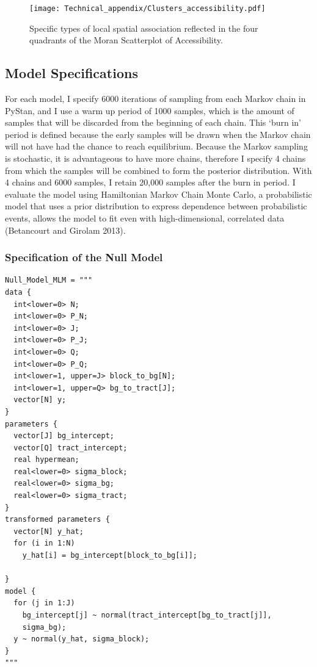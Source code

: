 \documentclass[a4paper,UKenglish]{lipics-v2018}
\begin{document}
\begin{figure}[H]
    \centering
    \texttt{[image: Technical\_appendix/Clusters\_accessibility.pdf]}
    \caption[Clusters of Accessibility]{Specific types of local spatial association reflected in the four quadrants of the Moran Scatterplot of Accessibility.} 
    \label{fig:Clusters Autocorrelation}
\end{figure}

\subsection{Model Specifications}
For each model, I specify 6000 iterations of sampling from each Markov chain in PyStan, and I use a warm up period of 1000 samples, which is the amount of samples that will be discarded from the beginning of each chain. This ‘burn in’ period is defined because the early samples will be drawn when the Markov chain will not have had the chance to reach equilibrium. Because the Markov sampling is stochastic, it is advantageous to have more chains, therefore I specify 4 chains from which the samples will be combined to form the posterior distribution. With 4 chains and 6000 samples, I retain 20,000 samples after the burn in period. I evaluate the model using Hamiltonian Markov Chain Monte Carlo, a probabilistic model that uses a prior distribution to express dependence between probabilistic events, allows the model to fit even with high-dimensional, correlated data (Betancourt and Girolam 2013).

\subsubsection{Specification of the Null Model}
\begin{lstlisting}[caption=Null Model example]
Null_Model_MLM = """
data {
  int<lower=0> N; 
  int<lower=0> P_N; 
  int<lower=0> J; 
  int<lower=0> P_J; 
  int<lower=0> Q; 
  int<lower=0> P_Q; 
  int<lower=1, upper=J> block_to_bg[N];
  int<lower=1, upper=Q> bg_to_tract[J];
  vector[N] y;
} 
parameters {
  vector[J] bg_intercept;
  vector[Q] tract_intercept;
  real hypermean;
  real<lower=0> sigma_block;
  real<lower=0> sigma_bg;
  real<lower=0> sigma_tract;
}
transformed parameters {
  vector[N] y_hat;
  for (i in 1:N)
    y_hat[i] = bg_intercept[block_to_bg[i]];
    
}
model {
  for (j in 1:J)
    bg_intercept[j] ~ normal(tract_intercept[bg_to_tract[j]], 
    sigma_bg);
  y ~ normal(y_hat, sigma_block);
}
"""
\end{lstlisting}
\end{document}
